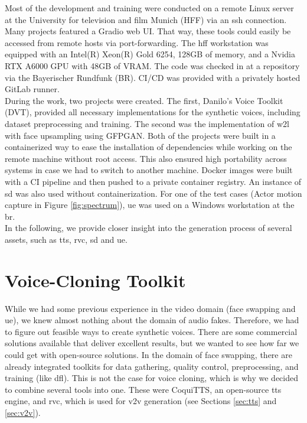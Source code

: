 \documentclass[
  a4paper,  %
  twoside,  %
  bibliography=totoc,
  headsepline,
  cleardoublepage=empty,
  parskip=half,
  draft=false
]{scrbook}
\begin{document}
Most of the development and training were conducted on a remote Linux server at the University for television and film Munich (HFF) via an \gls{ssh} connection. Many projects featured a Gradio web UI. That way, these tools could easily be accessed from remote hosts via port-forwarding. The \gls{hff} workstation was equipped with an Intel(R) Xeon(R) Gold 6254, 128GB of memory, and a Nvidia RTX A6000 GPU with 48GB of VRAM. The code was checked in at a repository via the Bayerischer Rundfunk (BR). CI/CD was provided with a privately hosted GitLab runner. \\
During the work, two projects were created. The first, Danilo's Voice Toolkit (DVT), provided all necessary implementations for the synthetic voices, including dataset preprocessing and training. The second was the implementation of \gls{w2l} with face upsampling using GFPGAN. Both of the projects were built in a containerized way to ease the installation of dependencies while working on the remote machine without root access. This also ensured high portability across systems in case we had to switch to another machine. Docker images were built with a CI pipeline and then pushed to a private container registry. An instance of \gls{sd} was also used without containerization. For one of the test cases (Actor motion capture in Figure \ref{fig:spectrum}), \gls{ue} was used on a Windows workstation at the \gls{br}. \\
In the following, we provide closer insight into the generation process of several assets, such as \gls{tts}, \gls{rvc}, \gls{sd} and \gls{ue}.

\section{Voice-Cloning Toolkit}
\label{sec:dvt}
While we had some previous experience in the video domain (face swapping and \gls{ue}), we knew almost nothing about the domain of audio fakes. Therefore, we had to figure out feasible ways to create synthetic voices. There are some commercial solutions available that deliver excellent results, but we wanted to see how far we could get with open-source solutions. In the domain of face swapping, there are already integrated toolkits for data gathering, quality control, preprocessing, and training (like \gls{dfl}). This is not the case for voice cloning, which is why we decided to combine several tools into one. These were CoquiTTS, an open-source \gls{tts} engine, and \gls{rvc}, which is used for \gls{v2v} generation (see Sections \ref{sec:tts} and \ref{sec:v2v}). 
\end{document}
